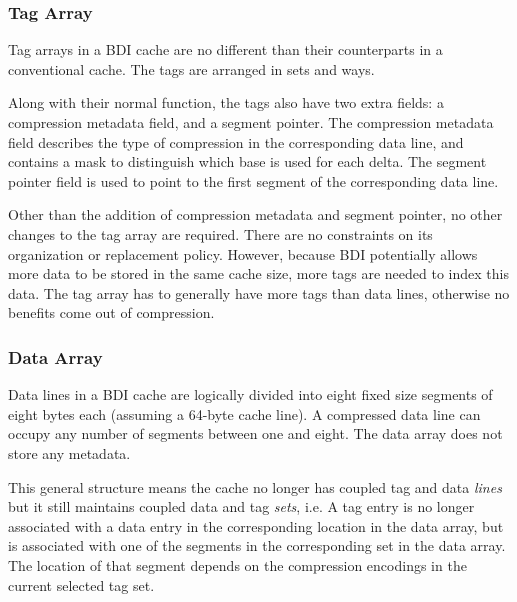\subsubsection{Tag Array}
\label{sssec:BDITag}
Tag arrays in a BDI cache are no different than their counterparts in a conventional cache. The tags are arranged in sets and ways.\par
Along with their normal function, the tags also have two extra fields: a compression metadata field, and a segment pointer. The compression metadata field describes the type of compression in the corresponding data line, and contains a mask to distinguish which base is used for each delta. The segment pointer field is used to point to the first segment of the corresponding data line.\par
Other than the addition of compression metadata and segment pointer, no other changes to the tag array are required. There are no constraints on its organization or replacement policy. However, because BDI potentially allows more data to be stored in the same cache size, more tags are needed to index this data. The tag array has to generally have more tags than data lines, otherwise no benefits come out of compression.
\subsubsection{Data Array}
\label{sssec:BDIData}
Data lines in a BDI cache are logically divided into eight fixed size segments of eight bytes each (assuming a 64-byte cache line). A compressed data line can occupy any number of segments between one and eight. The data array does not store any metadata.\par
This general structure means the cache no longer has coupled tag and data \textit{lines} but it still maintains coupled data and tag \textit{sets}, i.e. A tag entry is no longer associated with a data entry in the corresponding location in the data array, but is associated with one of the segments in the corresponding set in the data array. The location of that segment depends on the compression encodings in the current selected tag set.

